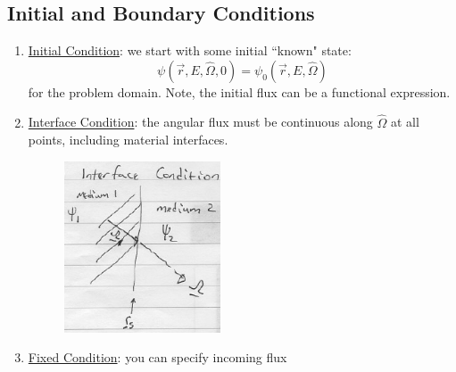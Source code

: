 \documentclass[12pt]{article}
\newif\ifeqns
\newcommand{\vOmega}{\ensuremath{\hat{\Omega}}}
\begin{document}
\subsection*{Initial and Boundary Conditions}
\begin{enumerate}
\item \underline{Initial Condition}: we start with some initial ``known" state:
\[\psi(\vec{r}, E, \vOmega, 0) = \psi_0(\vec{r}, E, \vOmega)\]
for the problem domain. Note, the initial flux can be a functional expression.

\item \underline{Interface Condition}: the angular flux must be continuous along $\vOmega$ at all points, including material interfaces.

\begin{minipage}{0.45\textwidth}
\begin{figure}[H]
\includegraphics[height=2in]{../figs/InterfaceCondition}
\end{figure}
\end{minipage} \hfill
\begin{minipage}{0.45\textwidth}
\ifeqns
$\psi_1(\vec{r}_S, E, \vOmega, t) = \psi_2(\vec{r}_S, E, \vOmega, t)$

\vspace*{1 em}
$\forall E$ and $\vOmega$.
\else
\vspace*{3em}
\fi
\end{minipage}

\item \underline{Fixed Condition}: you can specify incoming flux


\end{enumerate}
\end{document}
